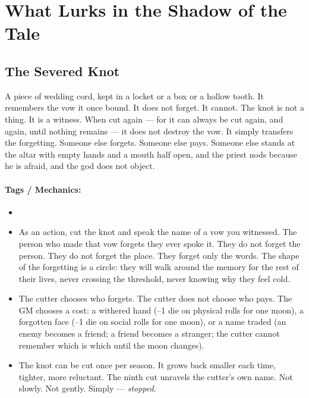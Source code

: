 \section*{What Lurks in the Shadow of the Tale}

\subsection*{The Severed Knot}

A piece of wedding cord, kept in a locket or a box or a hollow tooth. It remembers the vow it once bound. It does not forget. It cannot. The knot is not a thing. It is a witness. When cut again — for it can always be cut again, and again, until nothing remains — it does not destroy the vow. It simply transfers the forgetting. Someone else forgets. Someone else pays. Someone else stands at the altar with empty hands and a mouth half open, and the priest nods because he is afraid, and the god does not object.

\paragraph{Tags / Mechanics:}
\begin{itemize}
\item [CURSE] [TRUTH] [OATH] [SILENCE]
\item As an action, cut the knot and speak the name of a vow you witnessed. The person who made that vow forgets they ever spoke it. They do not forget the person. They do not forget the place. They forget only the words. The shape of the forgetting is a circle: they will walk around the memory for the rest of their lives, never crossing the threshold, never knowing why they feel cold.
\item The cutter chooses who forgets. The cutter does not choose who pays. The GM chooses a cost: a withered hand (--1 die on physical rolls for one moon), a forgotten face (--1 die on social rolls for one moon), or a name traded (an enemy becomes a friend; a friend becomes a stranger; the cutter cannot remember which is which until the moon changes).
\item The knot can be cut once per season. It grows back smaller each time, tighter, more reluctant. The ninth cut unravels the cutter's own name. Not slowly. Not gently. Simply — \textit{stopped}.
\end{itemize}

